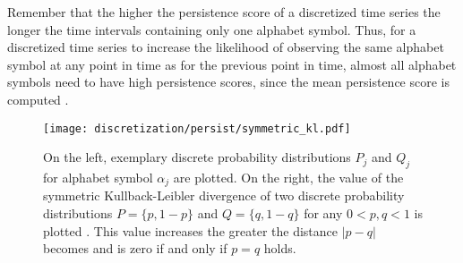 Remember that the higher the persistence score of a discretized time series the longer the time intervals containing only one alphabet symbol. Thus, for a discretized time series to increase the likelihood of observing the same alphabet symbol at any point in time as for the previous point in time, almost all alphabet symbols need to have high persistence scores, since the mean persistence score is computed \cite{Persist}.
\begin{figure}[htb]
\centering
\texttt{[image: discretization/persist/symmetric\_kl.pdf]}
\caption[Persist - Symmetric Kullback-Leibler Divergence]{On the left, exemplary discrete probability distributions $P_j$ and $Q_j$ for alphabet symbol $\alpha_j$ are plotted. On the right, the value of the symmetric Kullback-Leibler divergence of two discrete probability distributions $P = \{p,1-p\}$ and $Q = \{q,1-q\}$ for any $0 < p,q < 1$ is plotted \cite{Persist}. This value increases the greater the distance $|p-q|$ becomes and is zero if and only if $p = q$ holds.}
\label{fig:symmetric_kl}
\end{figure}
